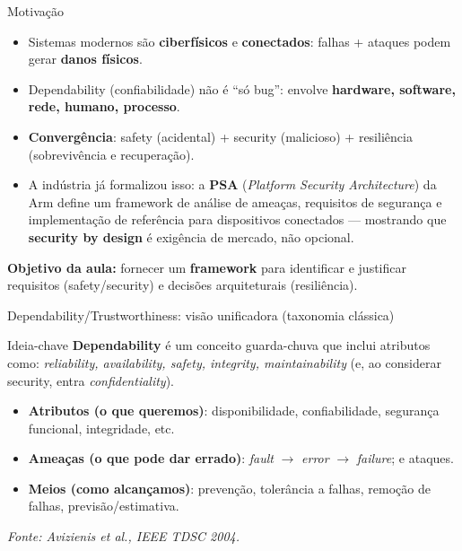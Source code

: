 \documentclass{beamer}
\begin{document}
\begin{frame}{Motivação}
\begin{itemize}
  \item Sistemas modernos são \textbf{ciberfísicos} e \textbf{conectados}: falhas + ataques podem gerar \textbf{danos físicos}.
  \item Dependability (confiabilidade) não é ``só bug'': envolve \textbf{hardware, software, rede, humano, processo}.
  \item \textbf{Convergência}: safety (acidental) + security (malicioso) + resiliência (sobrevivência e recuperação).
  \item A indústria já formalizou isso: a \textbf{PSA} (\textit{Platform Security Architecture}) da Arm define um framework de análise de ameaças, requisitos de segurança e implementação de referência para dispositivos conectados --- mostrando que \textbf{security by design} é exigência de mercado, não opcional.
\end{itemize}
\vspace{0.4em}
\small
\textbf{Objetivo da aula:} fornecer um \textbf{framework} para identificar e justificar requisitos (safety/security) e decisões arquiteturais (resiliência).
\end{frame}

\begin{frame}{Dependability/Trustworthiness: visão unificadora (taxonomia clássica)}
\begin{block}{Ideia-chave}
\textbf{Dependability} é um conceito guarda-chuva que inclui atributos como:
\textit{reliability, availability, safety, integrity, maintainability} (e, ao considerar security, entra \textit{confidentiality}).
\end{block}

\begin{itemize}
  \item \textbf{Atributos (o que queremos)}: disponibilidade, confiabilidade, segurança funcional, integridade, etc.
  \item \textbf{Ameaças (o que pode dar errado)}: \textit{fault} $\rightarrow$ \textit{error} $\rightarrow$ \textit{failure}; e ataques.
  \item \textbf{Meios (como alcançamos)}: prevenção, tolerância a falhas, remoção de falhas, previsão/estimativa.
\end{itemize}

\small
\hfill \textit{Fonte: Avizienis et al., IEEE TDSC 2004.}
\end{frame}
\end{document}
